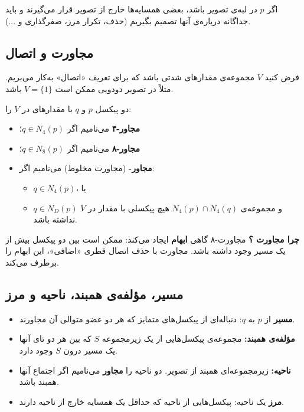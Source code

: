 \documentclass[11pt,a4paper]{article}
\begin{document}
	اگر $p$ در لبه‌ی تصویر باشد، بعضی همسایه‌ها خارج از تصویر قرار می‌گیرند و باید جداگانه
	درباره‌ی آنها تصمیم بگیریم (حذف، تکرار مرز، صفر‌گذاری و ...).
	
	\subsection{مجاورت و اتصال}
	
	فرض کنید $V$ مجموعه‌ی مقدارهای شدتی باشد که برای تعریف «اتصال» به‌کار می‌بریم.
	مثلاً در تصویر دودویی ممکن است $V=\{1\}$ باشد.
	
	دو پیکسل $p$ و $q$ با مقدارهای در $V$ را:
	
	\begin{itemize}
		\item \textbf{مجاور-۴} می‌نامیم اگر $q\in N_4(p)$؛
		\item \textbf{مجاور-۸} می‌نامیم اگر $q\in N_8(p)$؛
		\item \textbf{مجاور-} (مجاورت مخلوط) می‌نامیم اگر:
		\begin{itemize}
			\item $q\in N_4(p)$، یا
			\item $q\in N_D(p)$ و مجموعه‌ی $N_4(p)\cap N_4(q)$ هیچ پیکسلی با مقدار در $V$ نداشته باشد.
		\end{itemize}
	\end{itemize}
	
	\textbf{چرا مجاورت ؟} مجاورت-۸ گاهی \textbf{ابهام} ایجاد می‌کند: ممکن است بین دو پیکسل
	بیش از یک مسیر وجود داشته باشد. مجاورت  با حذف اتصال قطری «اضافی»، این ابهام را برطرف می‌کند.
	
	\subsection{مسیر، مؤلفه‌ی همبند، ناحیه و مرز}
	
	\begin{itemize}
		\item \textbf{مسیر} از $p$ به $q$: دنباله‌ای از پیکسل‌های متمایز که هر دو عضو متوالی آن مجاورند.
		\item \textbf{مؤلفه‌ی همبند:} مجموعه‌ی پیکسل‌هایی از یک زیرمجموعه $S$ که بین هر دو تای آنها یک مسیر درون $S$ وجود دارد.
		\item \textbf{ناحیه:} زیرمجموعه‌ای همبند از تصویر. دو ناحیه را \textbf{مجاور} می‌نامیم اگر اجتماع آنها همبند باشد.
		\item \textbf{مرز} یک ناحیه: پیکسل‌هایی از ناحیه که حداقل یک همسایه خارج از ناحیه دارند.
	\end{itemize}
	
\end{document}
